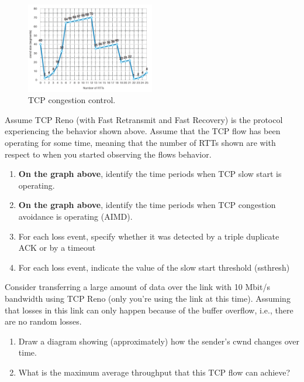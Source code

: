 \documentclass{report}
\begin{document}
\clearpage
\begin{problem}

\begin{figure}[!ht]
	\centering
	\includegraphics[width=0.5\textwidth]{image2.png}
	\caption{TCP congestion control.}
	\centering
	\label{fig:image2}
\end{figure}

Assume TCP Reno (with Fast Retransmit and Fast Recovery) is the protocol experiencing the behavior shown above. Assume that the TCP flow has been operating for some time, meaning that the number of RTTs shown are with respect to when you started observing the flows behavior.

\begin{enumerate}
\item \textbf{On the graph above}, identify the time periods when TCP slow start is operating.
\item \textbf{On the graph above}, identify the time periods when TCP congestion avoidance is operating (AIMD).
\item For each loss event, specify whether it was detected by a triple duplicate ACK or by a timeout
\item For each loss event, indicate the value of the slow start threshold (ssthresh)
\end{enumerate}

\begin{answer}{25em}

\end{answer}

\end{problem}

\clearpage
\begin{problem}

Consider transferring a large amount of data over the link with 10 Mbit/s bandwidth using TCP Reno (only you're using the link at this time). Assuming that losses in this link can only happen because of the buffer overflow, i.e., there are no random losses.
\begin{enumerate}
	\item Draw a diagram showing (approximately) how the sender’s cwnd changes over time.
	\item What is the maximum average throughput that this TCP flow can achieve?
\end{enumerate}

\begin{answer}{40em}
\end{answer}

\end{problem}
\end{document}
